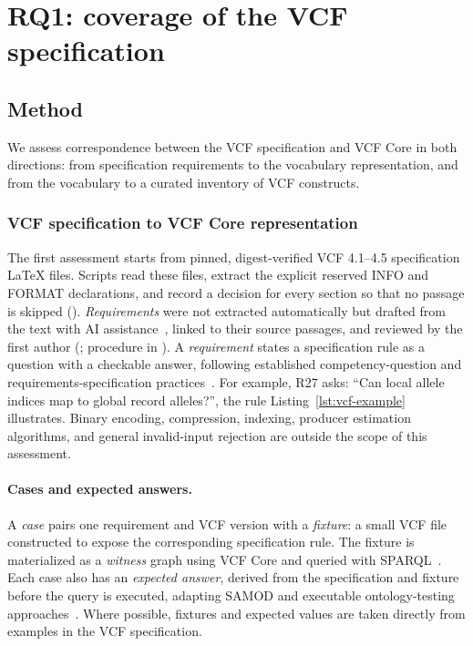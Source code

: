 \section{RQ1: coverage of the VCF specification}
\subsection{Method}
\label{sec:m-rq1}
We assess correspondence between the VCF specification and VCF Core in both directions: from specification requirements to the vocabulary representation, and from the vocabulary to a curated inventory of VCF constructs.

\subsubsection{VCF specification to VCF Core representation}
The first assessment starts from pinned, digest-verified VCF 4.1--4.5 specification \LaTeX{} files.
Scripts read these files, extract the explicit reserved INFO and FORMAT declarations, and record a decision for every section so that no passage is skipped (\href{https://github.com/ecrum19/SWAT4HCLS_2027/tree/main/RQ1/methodology/scripts}{}).
\emph{Requirements} were not extracted automatically but drafted from the text with AI assistance~\cite{anthropic2026claudeopus5,openai2026gpt6astra}, linked to their source passages, and reviewed by the first author (\href{https://github.com/ecrum19/SWAT4HCLS_2027/blob/main/RQ1/methodology/inputs/requirements.json}{}; procedure in \href{https://github.com/ecrum19/SWAT4HCLS_2027/blob/main/RQ1/EXPERIMENT.md}{}).
A \emph{requirement} states a specification rule as a question with a checkable answer, following established competency-question and requirements-specification practices~\cite{gruninger1995methodology,suarezfigueroa2009orsd,lot2022}.
For example, R27 asks: ``Can local allele indices map to global record alleles?'', the rule Listing~\ref{lst:vcf-example} illustrates.
Binary encoding, compression, indexing, producer estimation algorithms, and general invalid-input rejection are outside the scope of this assessment.

\paragraph{Cases and expected answers.}
A \emph{case} pairs one requirement and VCF version with a \emph{fixture}: a small VCF file constructed to expose the corresponding specification rule. 
The fixture is materialized as a \emph{witness} graph using VCF Core and queried with SPARQL~\cite{sparql2013}.
Each case also has an \emph{expected answer}, derived from the specification and fixture before the query is executed, adapting SAMOD and executable ontology-testing approaches~\cite{samod2016,blomqvist2012ontologytesting,wisniewski2019competencyquestions}. 
Where possible, fixtures and expected values are taken directly from examples in the VCF specification.

